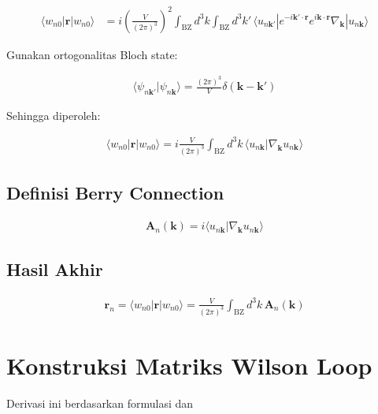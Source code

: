 \begin{align}
\langle w_{n0} |
\mathbf{r}
| w_{n0} \rangle
&=
i
\left(
\frac{V}{(2\pi)^3}
\right)^2
\int_{\text{BZ}} d^3k
\int_{\text{BZ}} d^3k'
\,
\langle u_{n\mathbf{k}'} |
e^{-i\mathbf{k}'\cdot\mathbf{r}}
e^{i\mathbf{k}\cdot\mathbf{r}}
\nabla_{\mathbf{k}}
| u_{n\mathbf{k}} \rangle
\end{align}

Gunakan ortogonalitas Bloch state:

\begin{align}
\langle \psi_{n\mathbf{k}'} | \psi_{n\mathbf{k}} \rangle
=
\frac{(2\pi)^3}{V}
\delta(\mathbf{k}-\mathbf{k}')
\end{align}

Sehingga diperoleh:

\begin{align}
\langle w_{n0} |
\mathbf{r}
| w_{n0} \rangle
=
i
\frac{V}{(2\pi)^3}
\int_{\text{BZ}} d^3k \,
\langle u_{n\mathbf{k}} |
\nabla_{\mathbf{k}}
u_{n\mathbf{k}} \rangle
\end{align}

\subsection*{Definisi Berry Connection}

\begin{align}
\mathbf{A}_n(\mathbf{k})
=
i
\langle u_{n\mathbf{k}} |
\nabla_{\mathbf{k}}
u_{n\mathbf{k}} \rangle
\end{align}

\subsection*{Hasil Akhir}

\begin{align}
\boxed{
\mathbf{r}_n
=
\langle w_{n0} |
\mathbf{r}
| w_{n0} \rangle
=
\frac{V}{(2\pi)^3}
\int_{\text{BZ}}
d^3k \,
\mathbf{A}_n(\mathbf{k})
}
\end{align}

\section{Konstruksi Matriks Wilson Loop}
Derivasi ini berdasarkan formulasi \parencite{PhysRevB.84.075119} dan \parencite{Yusufaly2013}

